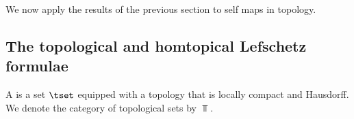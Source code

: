 
We now apply the results of the previous section to self maps in 
topology.


\subsection{The topological and homtopical Lefschetz formulae}

\begin{defn}
    A  is a set $\tset$ equipped
    with a topology that is locally compact and Hausdorff. We denote
    the category of topological sets by $\Top$. 
\end{defn}

